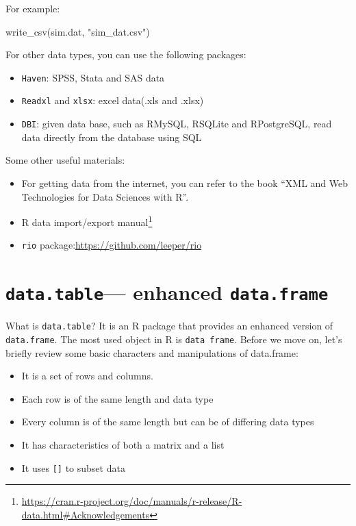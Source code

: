 \documentclass[
  12pt,
]{krantz}
\makeatletter
\newenvironment{Shaded}{\begin{snugshade}}{\end{snugshade}}
\newcommand{\FunctionTok}[1]{\textcolor[rgb]{0,0,0}{#1}}
\newcommand{\NormalTok}[1]{#1}
\newcommand{\StringTok}[1]{\textcolor[rgb]{0.5,0.5,0.5}{#1}}
\providecommand{\tightlist}{%
  \setlength{\itemsep}{0pt}\setlength{\parskip}{0pt}}
\renewcommand{\href}[2]{#2\footnote{\url{#1}}}
\newenvironment{kframe}{%
\medskip{}
\setlength{\fboxsep}{.8em}
 \def\at@end@of@kframe{}%
 \ifinner\ifhmode%
  \def\at@end@of@kframe{\end{minipage}}%
  \begin{minipage}{\columnwidth}%
 \fi\fi%
 \def\FrameCommand##1{\hskip\@totalleftmargin \hskip-\fboxsep
 \colorbox{shadecolor}{##1}\hskip-\fboxsep
     \hskip-\linewidth \hskip-\@totalleftmargin \hskip\columnwidth}%
 \MakeFramed {\advance\hsize-\width
   \@totalleftmargin\z@ \linewidth\hsize
   \@setminipage}}%
 {\par\unskip\endMakeFramed%
 \at@end@of@kframe}
\renewenvironment{Shaded}{\begin{kframe}}{\end{kframe}}
\makeatother
\begin{document}
For example:

\begin{Shaded}
\begin{Highlighting}[]
\FunctionTok{write\_csv}\NormalTok{(sim.dat, }\StringTok{"sim\_dat.csv"}\NormalTok{)}
\end{Highlighting}
\end{Shaded}

For other data types, you can use the following packages:

\begin{itemize}
\tightlist
\item
  \texttt{Haven}: SPSS, Stata and SAS data
\item
  \texttt{Readxl} and \texttt{xlsx}: excel data(.xls and .xlsx)
\item
  \texttt{DBI}: given data base, such as RMySQL, RSQLite and RPostgreSQL, read data directly from the database using SQL
\end{itemize}

Some other useful materials:

\begin{itemize}
\tightlist
\item
  For getting data from the internet, you can refer to the book ``XML and Web Technologies for Data Sciences with R''.\\
\item
  \href{https://cran.r-project.org/doc/manuals/r-release/R-data.html\#Acknowledgements}{R data import/export manual}
\item
  \texttt{rio} package:\url{https://github.com/leeper/rio}
\end{itemize}

\hypertarget{data.table-enhanced-data.frame}{%
\section{\texorpdfstring{\texttt{data.table}--- enhanced \texttt{data.frame}}{data.table--- enhanced data.frame}}\label{data.table-enhanced-data.frame}}

What is \texttt{data.table}? It is an R package that provides an enhanced version of \texttt{data.frame}. The most used object in R is \texttt{data\ frame}. Before we move on, let's briefly review some basic characters and manipulations of data.frame:

\begin{itemize}
\tightlist
\item
  It is a set of rows and columns.
\item
  Each row is of the same length and data type
\item
  Every column is of the same length but can be of differing data types
\item
  It has characteristics of both a matrix and a list
\item
  It uses \texttt{{[}{]}} to subset data
\end{itemize}
\end{document}
